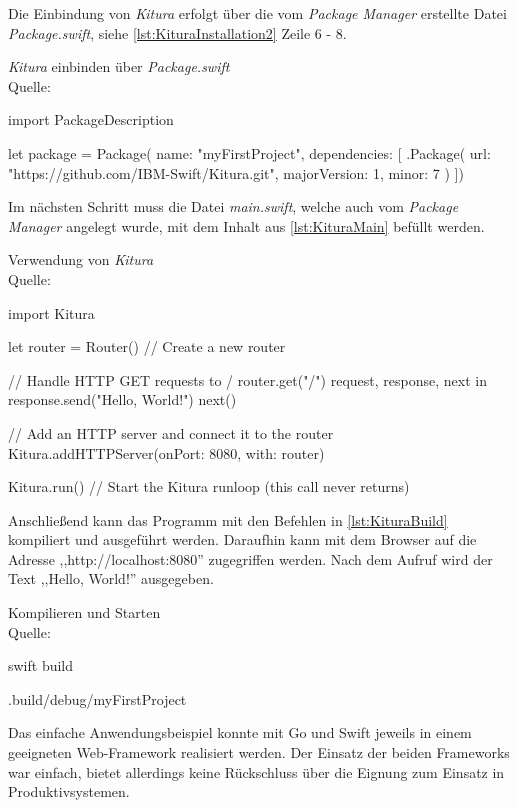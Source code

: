 Die Einbindung von \textit{Kitura} erfolgt über die vom \textit{Package Manager} erstellte Datei \textit{Package.swift}, siehe \autoref{lst:KituraInstallation2} Zeile 6 - 8.

\begin{listing}[H]
\caption{\textit{Kitura} einbinden über \textit{Package.swift} \\ Quelle:\cite{Kitura}}
\label{lst:KituraInstallation2}
\begin{SwiftCode}
import PackageDescription

let package = Package(
    name: "myFirstProject",
    dependencies: [
        .Package(
            url: "https://github.com/IBM-Swift/Kitura.git", 
            majorVersion: 1, minor: 7
        )
    ])
\end{SwiftCode}
\end{listing}

Im nächsten Schritt muss die Datei \textit{main.swift}, welche auch vom \textit{Package Manager} angelegt wurde, mit dem Inhalt aus \autoref{lst:KituraMain} befüllt werden.

\begin{listing}[H]
\caption{Verwendung von \textit{Kitura} \\ Quelle:\cite{Kitura}}
\label{lst:KituraMain}
\begin{SwiftCode}
import Kitura

let router = Router() // Create a new router

// Handle HTTP GET requests to /
router.get("/") { 
    request, response, next in
    response.send("Hello, World!")
    next()
}

// Add an HTTP server and connect it to the router
Kitura.addHTTPServer(onPort: 8080, with: router)

Kitura.run() // Start the Kitura runloop (this call never returns)
\end{SwiftCode}
\end{listing}

Anschließend kann das Programm mit den Befehlen in \autoref{lst:KituraBuild} kompiliert und ausgeführt werden. 
Daraufhin kann mit dem Browser auf die Adresse ,,http://localhost:8080'' zugegriffen werden.
Nach dem Aufruf wird der Text ,,Hello, World!'' ausgegeben.

\begin{listing}[H]
\caption{Kompilieren und Starten \\ Quelle:\cite{Kitura}}
\label{lst:KituraBuild}
\begin{Commandline}
swift build

.build/debug/myFirstProject
\end{Commandline}
\end{listing}

Das einfache Anwendungsbeispiel konnte mit Go und Swift jeweils in einem geeigneten Web-Framework realisiert werden.
Der Einsatz der beiden Frameworks war einfach, bietet allerdings keine Rückschluss über die Eignung zum Einsatz in Produktivsystemen. 